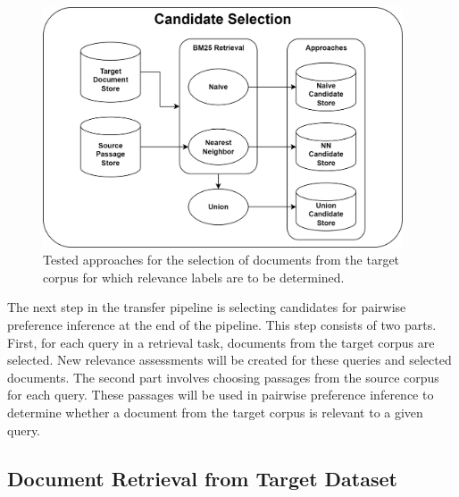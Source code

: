 \begin{figure}[ht]
    \centering
    \includegraphics[width=0.95\textwidth]{./graphics/drawio/candidate_selection.png}
    \caption{Tested approaches for the selection of documents from the target corpus for which relevance labels are to be determined.}
\end{figure}

The next step in the transfer pipeline is selecting candidates for pairwise preference inference at the end of the pipeline. This step consists of two parts. First, for each query in a retrieval task, documents from the target corpus are selected. New relevance assessments will be created for these queries and selected documents. The second part involves choosing passages from the source corpus for each query. These passages will be used in pairwise preference inference to determine whether a document from the target corpus is relevant to a given query.

\subsection{Document Retrieval from Target Dataset}\label{document-retrieval-from-target-dataset}

